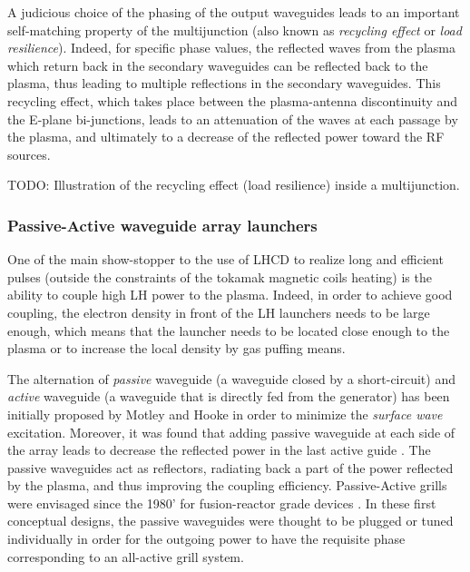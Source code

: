 {A judicious choice of the phasing of the output waveguides leads to an important self-matching property of the multijunction (also known as \emph{recycling effect} or \emph{load resilience}). Indeed, for specific phase values, the reflected waves from the plasma which return back in the secondary waveguides can be reflected back to the plasma, thus leading to multiple reflections in the secondary waveguides. This recycling effect, which takes place between the plasma-antenna discontinuity and the E-plane bi-junctions, leads to an attenuation of the waves at each passage by the plasma, and ultimately to a decrease of the reflected power toward the RF sources. 

TODO: Illustration of the recycling effect (load resilience) inside a multijunction.



\subsubsection{Passive-Active waveguide array launchers}
One of the main show-stopper to the use of LHCD to realize long and efficient pulses (outside the constraints of the tokamak magnetic coils heating) is the ability to couple high LH power to the plasma. Indeed, in order to achieve good coupling, the electron density in front of the LH launchers needs to be large enough, which means that the launcher needs to be located close enough to the plasma or to increase the local density by gas puffing means. 

The alternation of \emph{passive} waveguide (a waveguide closed by a short-circuit) and \emph{active} waveguide (a waveguide that is directly fed from the generator) has been initially proposed by Motley and Hooke  in order to minimize the \emph{surface wave} excitation. Moreover, it was found that adding passive waveguide at each side of the array leads to decrease the reflected power in the last active guide . The passive waveguides act as reflectors, radiating back a part of the power reflected by the plasma, and thus improving the coupling efficiency. Passive-Active grills were envisaged since the 1980' for fusion-reactor grade devices . In these first conceptual designs, the passive waveguides were thought to be plugged or tuned individually in order for the outgoing power to have the requisite phase corresponding to an all-active grill system. 

}
